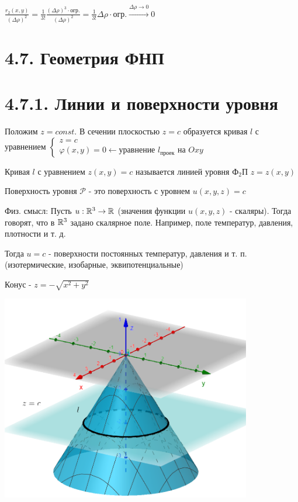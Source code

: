 \documentclass[12pt]{article}
\begin{document}
    $\frac{r_2(x, y)}{(\Delta \rho)^2} = \frac{1}{3!} \frac{(\Delta \rho)^3 \cdot \text{огр.}}{(\Delta \rho)^2} = \frac{1}{3!} \Delta \rho \cdot \text{огр.} \stackrel{\Delta \rho \to 0}{\rightarrow} 0$

    \section{4.7. Геометрия ФНП}


    \section{4.7.1. Линии и поверхности уровня}

    Положим $z = const$. В сечении плоскостью $z = c$ образуется кривая $l$ с уравнением $\begin{cases}z = c \\ \varphi(x, y) = 0 \leftarrow \text{уравнение $l_\text{проек}$ на $Oxy$}\end{cases}$

    Кривая $l$ с уравнением $z(x, y) = c$ называется линией уровня Ф$_2$П $z = z(x, y)$

    \Def Поверхность уровня $\mathcal{P}$ - это поверхность с уровнем $u(x, y, z) = c$

    Физ. смысл: Пусть $u : \mathbb{R}^3 \rightarrow \mathbb{R}$ (значения функции $u(x, y, z)$ - скаляры). Тогда говорят, что в $\mathbb{R}^3$ задано скалярное поле. Например, поле температур, давления, плотности и т. д.

    Тогда $u = c$ - поверхности постоянных температур, давления и т. п. (изотермические, изобарные, эквипотенциальные)

    \Ex Конус - $z = -\sqrt{x^2 + y^2}$

    \includegraphics[height=90mm]{calculus/images/calculus_2024_03_13_1}
\end{document}
